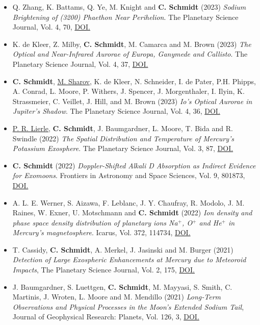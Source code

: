 \documentclass[12pt]{report}
\begin{document}
\begin{itemize}
  \item Q. Zhang, K. Battams, Q. Ye, M. Knight and \textbf{C. Schmidt} (2023) \textit{Sodium Brightening of (3200) Phaethon Near Perihelion}. The Planetary Science Journal, Vol. 4, 70, \href{https://doi.org/10.3847/PSJ/acc866}{DOI.} 
  \item K. de Kleer, Z. Milby, \textbf{C. Schmidt}, M. Camarca and M. Brown (2023) \textit{The Optical and Near-Infrared Aurorae of Europa, Ganymede and Callisto}. The Planetary Science Journal, Vol. 4, 37, \href{https://doi.org/10.3847/PSJ/acb53c}{DOI.} 
  \item \textbf{C. Schmidt}, \underline{M. Sharov}, K. de Kleer, N. Schneider, I. de Pater, P.H. Phipps, A. Conrad, L. Moore, P. Withers, J. Spencer, J. Morgenthaler, I. Ilyin, K. Strassmeier, C. Veillet, J. Hill, and M. Brown (2023) \textit{Io’s Optical Aurorae in Jupiter’s Shadow}. The Planetary Science Journal, Vol. 4, 36, \href{https://doi.org/10.3847/PSJ/ac85b0}{DOI.} 
  \item \underline{P. R. Lierle}, \textbf{C. Schmidt}, J. Baumgardner, L. Moore, T. Bida and R. Swindle (2022) \textit{The Spatial Distribution and Temperature of Mercury’s Potassium Exosphere}. The Planetary Science Journal, Vol. 3, 87, \href{https://doi.org/10.3847/PSJ/ac5c4d}{DOI.} 
  \item \textbf{C. Schmidt} (2022) \textit{Doppler-Shifted Alkali D Absorption as Indirect Evidence for Exomoons}. Frontiers in Astronomy and Space Sciences, Vol. 9, 801873, \href{https://doi.org/10.3389/fspas.2022.801873}{DOI.}
  \item A. L. E. Werner, S. Aizawa, F. Leblanc, J. Y. Chaufray, R. Modolo, J. M. Raines, W. Exner, U. Motschmann and \textbf{C. Schmidt} (2022) \textit{Ion density and phase space density distribution of planetary ions Na$^+$, O$^+$ and He$^+$ in Mercury's magnetosphere}. Icarus, Vol. 372, 114734, \href{https://doi.org/10.1016/j.icarus.2021.114734}{DOI.}
  \item  T. Cassidy, \textbf{C. Schmidt}, A. Merkel, J. Jasinski and M. Burger (2021) \textit{Detection of Large Exospheric Enhancements at Mercury due to Meteoroid Impacts}, The Planetary Science Journal, Vol. 2, 175, \href{https://doi.org/10.3847/PSJ/ac1a19}{DOI.}
  \item J. Baumgardner, S. Luettgen, \textbf{C. Schmidt}, M. Mayyasi, S. Smith, C. Martinis, J. Wroten, L. Moore and M. Mendillo (2021) \textit{Long‐Term Observations and Physical Processes in the Moon’s Extended Sodium Tail}, Journal of Geophysical Research: Planets, Vol. 126, 3, \href{https://doi.org/10.1029/2020JE006671}{DOI.}

\end{itemize}
\end{document}
